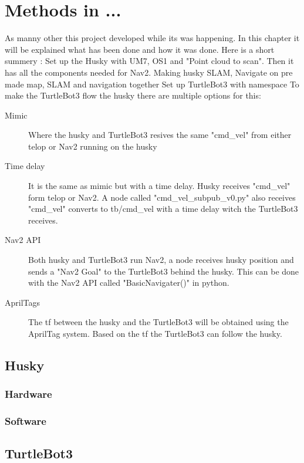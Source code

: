\chapter{Methods in ...}

As manny other  this project developed while its was happening. In this chapter it will be explained what has been done and how it was done. Here is a short summery : 
Set up the Husky with UM7, OS1 and "Point cloud to scan". Then it has all the components needed for Nav2. 
Making husky SLAM, Navigate on pre made map, SLAM and navigation together 
Set up TurtleBot3 with namespace 
To make the TurtleBot3 flow the husky there are multiple options for this: 

\begin{description}
   \item[Mimic] Where the husky and TurtleBot3 resives the same "cmd\_vel" from either telop or Nav2 running on the husky
   \item[Time delay] It is the same as mimic but with a time delay. Husky receives "cmd\_vel" form telop or Nav2. A node called "cmd\_vel\_subpub\_v0.py" also receives "cmd\_vel" converts to tb/cmd\_vel with a time delay witch the TurtleBot3 receives. 
   \item[Nav2 API] Both husky and TurtleBot3 run Nav2, a node receives husky position and sends a "Nav2 Goal" to the TurtleBot3 behind the husky. This can be done with the Nav2 API called "BasicNavigater()" in python.
   \item[AprilTags] The tf between the husky and the TurtleBot3 will be obtained using the AprilTag system. Based on the tf the TurtleBot3 can follow the husky. 
\end{description}


\section{Husky}
\subsection{Hardware}

\subsection{Software}

\section{TurtleBot3}
